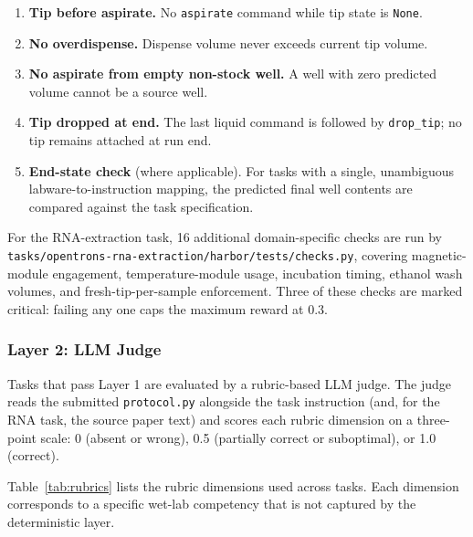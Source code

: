 \documentclass[11pt,a4paper]{article}
\begin{document}
\begin{enumerate}[label=AC\arabic*., leftmargin=*]
  \item \textbf{Tip before aspirate.} No \texttt{aspirate} command while
    tip state is \texttt{None}.
  \item \textbf{No overdispense.} Dispense volume never exceeds current
    tip volume.
  \item \textbf{No aspirate from empty non-stock well.} A well with zero
    predicted volume cannot be a source well.
  \item \textbf{Tip dropped at end.} The last liquid command is followed
    by \texttt{drop\_tip}; no tip remains attached at run end.
  \item \textbf{End-state check} (where applicable). For tasks with a
    single, unambiguous labware-to-instruction mapping, the predicted
    final well contents are compared against the task specification.
\end{enumerate}

For the RNA-extraction task, 16 additional domain-specific checks are run by
\texttt{tasks/opentrons-rna-extraction/harbor/tests/checks.py}, covering
magnetic-module engagement, temperature-module usage, incubation timing,
ethanol wash volumes, and fresh-tip-per-sample enforcement.
Three of these checks are marked critical: failing any one caps the maximum
reward at 0.3.

\subsubsection{Layer 2: LLM Judge}
\label{sec:layer2}

Tasks that pass Layer 1 are evaluated by a rubric-based LLM judge.
The judge reads the submitted \texttt{protocol.py} alongside the task
instruction (and, for the RNA task, the source paper text) and scores
each rubric dimension on a three-point scale: 0 (absent or wrong),
0.5 (partially correct or suboptimal), or 1.0 (correct).

Table~\ref{tab:rubrics} lists the rubric dimensions used across tasks.
Each dimension corresponds to a specific wet-lab competency that
is not captured by the deterministic layer.
\end{document}
